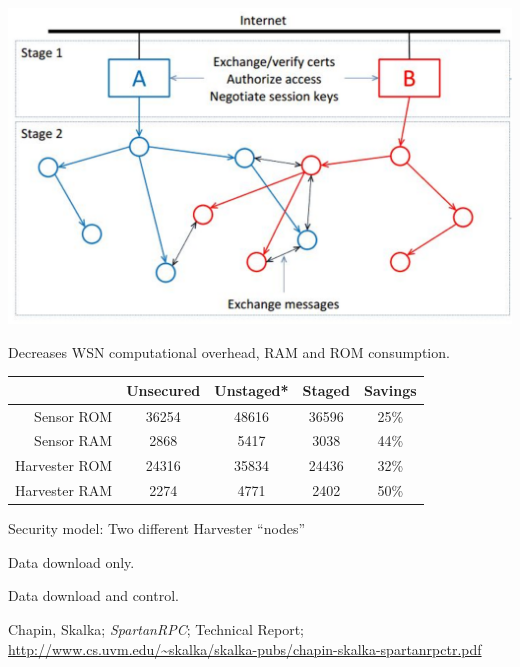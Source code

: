 \stopslide


\hspace*{.6in}\includegraphics{spartanrpc}

Decreases WSN computational overhead, RAM and ROM consumption. 
\stopslide


\begin{center}
\begin{tabular}{|r||c|c|c|c|} \hline
              & Unsecured & Unstaged* & Staged & Savings\\ \hline
Sensor ROM    &     36254 &    48616 &  36596 & 25\% \\
Sensor RAM    &      2868 &     5417 &   3038 & 44\% \\ \hline
Harvester ROM &     24316 &    35834 &  24436 & 32\% \\
Harvester RAM &      2274 &     4771 &   2402 & 50\% \\ \hline
\end{tabular}
\end{center}
\begin{citemize}
\item Security model: Two different Harvester ``nodes''
\begin{cenumerate}
\item Data download only.
\item Data download and control.
\end{cenumerate}
\end{citemize}
\vspace{0.75in}
{\small * Chapin, Skalka; \textit{SpartanRPC}; Technical Report;
  \url{http://www.cs.uvm.edu/~skalka/skalka-pubs/chapin-skalka-spartanrpctr.pdf}}
\stopslide

